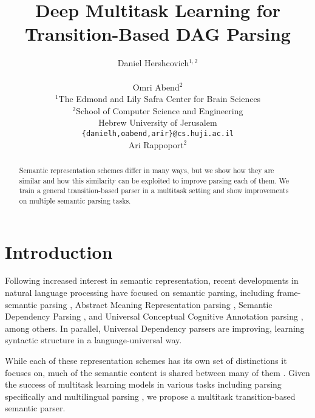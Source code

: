 \documentclass[11pt,a4paper]{article}
\title{Deep Multitask Learning for Transition-Based DAG Parsing}
\author{Daniel Hershcovich$^{1,2}$ \\
  \\\And
  Omri Abend$^2$ \\
  $^1$The Edmond and Lily Safra Center for Brain Sciences \\
  $^2$School of Computer Science and Engineering \\
  Hebrew University of Jerusalem \\
  \texttt{\{danielh,oabend,arir\}@cs.huji.ac.il}
  \\\And
  Ari Rappoport$^2$
}
\date{}
\begin{document}
\maketitle
\begin{abstract}
  Semantic representation schemes differ in many ways, but we show
  how they are similar and how this similarity can be exploited to
  improve parsing each of them.
  We train a general transition-based parser in a multitask setting
  and show improvements on multiple semantic parsing tasks.
\end{abstract}

\section{Introduction}\label{sec:introduction}

Following increased interest in semantic representation,
recent developments in natural language processing have focused on semantic parsing,
including frame-semantic parsing \cite{gildea2002automatic,swayamdipta2017frame,ringgaard2017sling},
Abstract Meaning Representation parsing \cite{damonte-17,11099},
Semantic Dependency Parsing \cite{P17-1186}, and
Universal Conceptual Cognitive Annotation parsing \cite{hershcovich2017a}, among others.
In parallel, Universal Dependency parsers \cite{dozat2016deep} are improving,
learning syntactic structure in a language-universal way.

While each of these representation schemes has its own set of distinctions it focuses on,
much of the semantic content is shared between many of them \cite{abend2017state}.
Given the success of multitask learning models in various tasks
\cite{collobert2008unified,luong2015multi,ruder2017overview}
including parsing specifically
\cite{Zhang2016StackpropagationIR,P17-1186,swayamdipta2017frame,guo2016exploiting}
and multilingual parsing \cite{TACL892},
we propose a multitask transition-based semantic parser.
\end{document}
